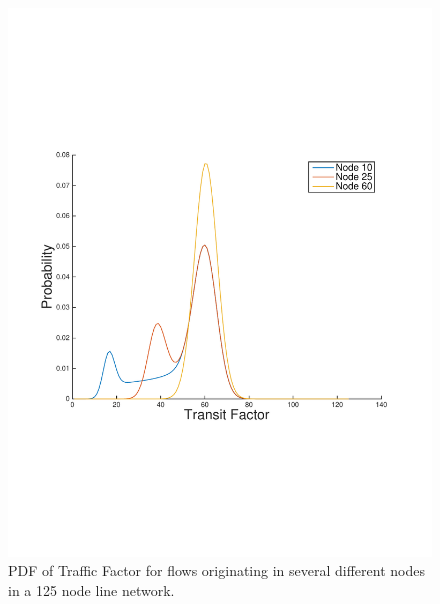 \begin{figure}
\begin{centering}
    \includegraphics[scale=0.4, clip=true, trim=15mm 65mm 20mm 65mm]{figures/PDF_TF_line_net_125.pdf}
    \caption{PDF of Traffic Factor for flows originating in several different nodes in a 125 node line network.}
    \label{fig:PDF_TF_line_net}
\end{centering}
\end{figure}

